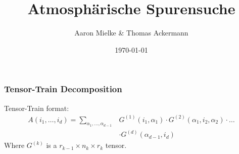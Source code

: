 \documentclass{beamer}
\title{Atmosphärische Spurensuche}
\author{Aaron Mielke \& Thomas Ackermann}
\date{\today}
\begin{document}
\maketitle


\begin{frame}
\frametitle{Tensor-Train Decomposition}
Tensor-Train format:
\begin{align*}
    A (i_1, \ldots, i_d) = \sum_{\alpha_1, \ldots , \alpha_{d-1}}&  G^{(1)} (i_1, \alpha_1) \cdot G^{(2)}(\alpha_1, i_2, \alpha_2) \cdot \ldots \\
   & \cdot G^{(d)} (\alpha_{d-1}, i_d) 
\end{align*}
Where $G^{(k)}$ is a $r_{k-1} \times n_k \times r_k$ tensor.
\end{frame}
\end{document}
